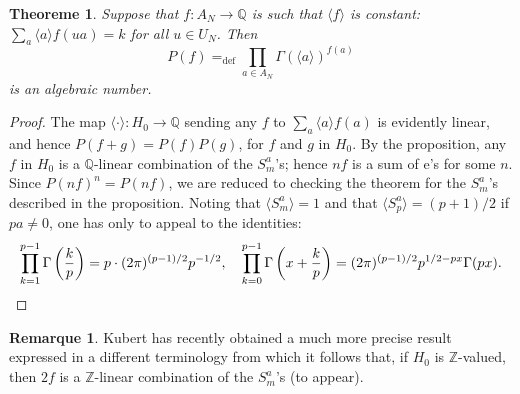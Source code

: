 \documentclass[12pt,a4paper]{article}
\theoremstyle{plain}
\newtheorem{theorem}{Theoreme}[section]
\theoremstyle{definition}
\newtheorem{remark}[definition]{Remarque}
\theoremstyle{remark}
\newcommand{\Q}{\mathbb{Q}}
\newcommand{\Z}{\mathbb{Z}}
\begin{document}
\begin{theorem}
Suppose that $f: A_N \to \Q$ is such that $\langle f \rangle$ is constant:
$\sum_a \langle a \rangle f(ua) = k$ for all $u \in U_N$. Then
\[
P(f) =_{\text{def}} \prod_{a \in A_N} \Gamma(\langle a \rangle)^{f(a)}
\]
is an algebraic number.
\end{theorem}

\begin{proof}
The map $\langle \cdot \rangle: H_0 \to \Q$ sending any $f$ to $\sum_a \langle a \rangle f(a)$ is evidently linear,
and hence $P(f+g) = P(f) P(g)$, for $f$ and $g$ in $H_0$. By the proposition, any
$f$ in $H_0$ is a $\Q$-linear combination of the $S_m^a$'s; hence $nf$ is a sum of
e's for some $n$. Since $P(nf)^n = P(nf)$, we are reduced to checking the theorem
for the $S_m^a$'s described in the proposition. Noting that $\langle S_m^a \rangle = 1$ and that
$\langle S_p^a \rangle = (p+1)/2$ if $pa \neq 0$, one has only to appeal to the identities:
\[
\prod_{k=1}^{p-1} \Gamma\left(\frac{k}{p}\right) = p \cdot (2\pi)^{(p-1)/2} p^{-1/2},
\quad
\prod_{k=0}^{p-1} \Gamma\left(x + \frac{k}{p}\right) = (2\pi)^{(p-1)/2} p^{1/2-px} \Gamma(px). \qedhere
\]
\end{proof}

\begin{remark}
Kubert has recently obtained a much more precise result expressed in a
different terminology from which it follows that, if $H_0$ is $\Z$-valued, then $2f$
is a $\Z$-linear combination of the $S_m^a$'s (to appear).
\end{remark}
\end{document}
